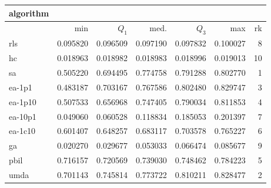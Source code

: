 \begin{tabular}{@{}l*{5}{>{{}}N{1}{3}}>{{}}N{2}{0}@{}}
\toprule
{algorithm} &  \\
\midrule
& {min} & {$Q_1$} & {med.} & {$Q_3$} & {max} & {rk}\\
\midrule
rls & 0.095820 & 0.096509 & 0.097190 & 0.097832 & 0.100027 & 8\\
hc & 0.018963 & 0.018982 & 0.018983 & 0.018996 & 0.019013 & 10\\
sa & 0.505220 & 0.694495 & {\color{blue}} 0.774758 & 0.791288 & 0.802770 & 1\\
ea-1p1 & 0.483187 & 0.703167 & 0.767586 & 0.802480 & {\color{blue}} 0.829747 & 3\\
ea-1p10 & 0.507533 & 0.656968 & 0.747405 & 0.790034 & 0.811853 & 4\\
ea-10p1 & 0.049060 & 0.060528 & 0.118834 & 0.185053 & 0.201397 & 7\\
ea-1c10 & 0.601407 & 0.648257 & 0.683117 & 0.703578 & 0.765227 & 6\\
ga & 0.020270 & 0.029677 & 0.053033 & 0.066474 & 0.085677 & 9\\
pbil & {\color{blue}} 0.716157 & 0.720569 & 0.739030 & 0.748462 & 0.784223 & 5\\
umda & 0.701143 & {\color{blue}} 0.745814 & 0.773722 & {\color{blue}} 0.810211 & 0.828477 & 2\\
\bottomrule
\end{tabular}

